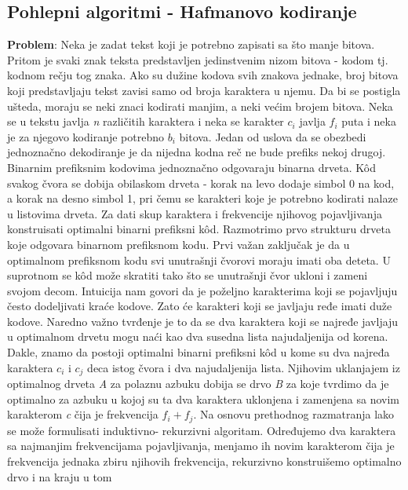 \documentclass{article}
\begin{document}
\subsection{Pohlepni algoritmi - Hafmanovo kodiranje}
\textbf{Problem}: Neka je zadat tekst koji je potrebno zapisati sa što manje bitova.
Pritom je svaki znak teksta predstavljen jedinstvenim nizom bitova - kodom
tj. kodnom rečju tog znaka. Ako su dužine kodova svih znakova jednake, broj bitova koji
predstavljaju tekst zavisi samo od broja karaktera u njemu. Da bi se postigla
ušteda, moraju se neki znaci kodirati manjim, a neki većim brojem bitova. Neka
se u tekstu javlja \textit{n} različitih karaktera i neka se karakter $c_i$ javlja $f_i$ puta i neka je za njegovo kodiranje potrebno $b_i$ bitova. Jedan od uslova
da se obezbedi jednoznačno dekodiranje je da nijedna kodna reč ne bude prefiks
nekoj drugoj. Binarnim prefiksnim
kodovima jednoznačno odgovaraju binarna drveta. Kôd svakog čvora se dobija
obilaskom drveta - korak na levo dodaje simbol 0 na kod, a korak na desno
simbol 1, pri čemu se karakteri koje je potrebno kodirati nalaze u listovima
drveta. Za dati skup karaktera i frekvencije njihovog pojavljivanja konstruisati optimalni binarni prefiksni kôd.
\newline
Razmotrimo prvo strukturu drveta koje odgovara binarnom prefiksnom kodu.
Prvi važan zaključak je da u optimalnom prefiksnom kodu svi unutrašnji čvorovi
moraju imati oba deteta. U suprotnom se kôd može skratiti tako što se unutrašnji
čvor ukloni i zameni svojom decom. 
\newline Intuicija nam govori da je poželjno karakterima koji se pojavljuju često dodeljivati
kraće kodove. Zato će karakteri koji se javljaju ređe imati duže kodove. Naredno važno tvrđenje je to da se dva karaktera koji se najređe javljaju u optimalnom drvetu mogu naći kao dva susedna lista najudaljenija od korena. Dakle, znamo da postoji optimalni binarni prefiksni kôd u kome su dva najređa
karaktera $c_i$ i $c_j$ deca istog čvora i dva najudaljenija lista. Njihovim uklanjajem
iz optimalnog drveta \textit{A} za polaznu azbuku dobija se drvo \textit{B} za koje tvrdimo da je
optimalno za azbuku u kojoj su ta dva karaktera uklonjena i zamenjena sa novim
karakterom \textit{c} čija je frekvencija $f_i + f_j$.
\newline
Na osnovu prethodnog razmatranja lako se može formulisati induktivno-
rekurzivni algoritam. Određujemo dva karaktera sa najmanjim frekvencijama
pojavljivanja, menjamo ih novim karakterom čija je frekvencija jednaka zbiru
njihovih frekvencija, rekurzivno konstruišemo optimalno drvo i na kraju u tom
\end{document}
